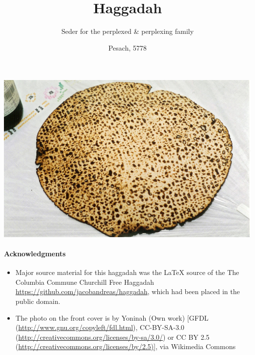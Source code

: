 \documentclass[12pt,a4wide,openany]{memoir}
\title{\vspace*{-4cm}Haggadah}
\author{\vspace*{-1cm}Seder for the perplexed \& perplexing family}
\date{Pesach, 5778}
\begin{document}
\frontmatter
{}\afterpage{\restorepagecolor}
\maketitle
\thispagestyle{empty}



\noindent\hspace*{-5cm}
\vspace*{-3cm}
\includegraphics[width=232mm]{figs/matzo.jpg}
\thispagestyle{empty}



\newpage

\phantom{Deliberately blank}
\thispagestyle{empty}

\newpage
\setcounter{page}{1}
\maketitle

\newpage
\vfill\phantom{Hello}\vfill

\vfill
\paragraph*{Acknowledgments}

\begin{itemize}
\item Major  source material for this haggadah was the {\LaTeX}
  source of the The Columbia Commune Churchill Free Haggadah
  \url{https://github.com/jacobandreas/haggadah}, which had been
  placed in the public domain.
\item The photo on the
  front cover is by Yoninah (Own work) [GFDL
  (\url{http://www.gnu.org/copyleft/fdl.html}), CC-BY-SA-3.0
  (\url{http://creativecommons.org/licenses/by-sa/3.0/}) or CC BY 2.5
  (\url{http://creativecommons.org/licenses/by/2.5)}], via Wikimedia
  Commons
\end{itemize}
\end{document}
